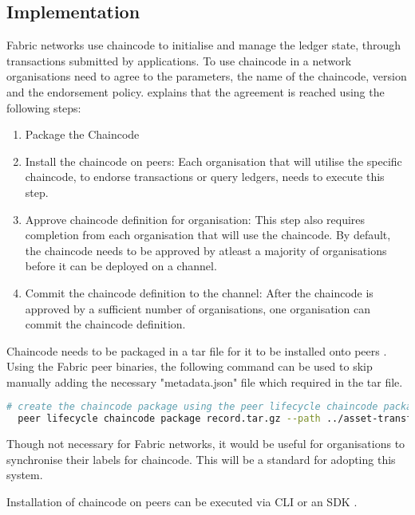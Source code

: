 \subsection{Implementation}
Fabric networks use chaincode to initialise and manage the ledger state, through transactions submitted by applications. \cite{noauthor_writing_nodate}
To use chaincode in a network organisations need to agree to the parameters, the name of the chaincode, version and the endorsement policy. 
\cite{noauthor_writing_nodate} explains that the agreement is reached using the following steps:
\begin{enumerate}
  \item Package the Chaincode
  \item Install the chaincode on peers: Each organisation that will utilise the specific chaincode, to endorse transactions or query ledgers, needs to execute this step.
  \item Approve chaincode definition for organisation: This step also requires completion from each organisation that will use the chaincode. By default, the chaincode needs to be approved by atleast a majority of organisations before it can be deployed on a channel.
  \item Commit the chaincode definition to the channel: After the chaincode is approved by a sufficient number of organisations, one organisation can commit the chaincode definition.
\end{enumerate}

Chaincode needs to be packaged in a tar file for it to be installed onto peers \cite{noauthor_fabric_nodate}. Using the Fabric peer binaries, the following command can be used to skip manually adding the necessary "metadata.json" file which required in the tar file.
\begin{lstlisting}[language=bash, caption={peer lifecycle chaincode package command}]
  # create the chaincode package using the peer lifecycle chaincode package command
  peer lifecycle chaincode package record.tar.gz --path ../asset-transfer-basic/chaincode-go/ --lang golang --label record_1.0
\end{lstlisting}

Though not necessary for Fabric networks, it would be useful for organisations to synchronise their labels for chaincode. This will be a standard for adopting this system.

Installation of chaincode on peers can be executed via CLI or an SDK \cite{noauthor_fabric_nodate}. %

